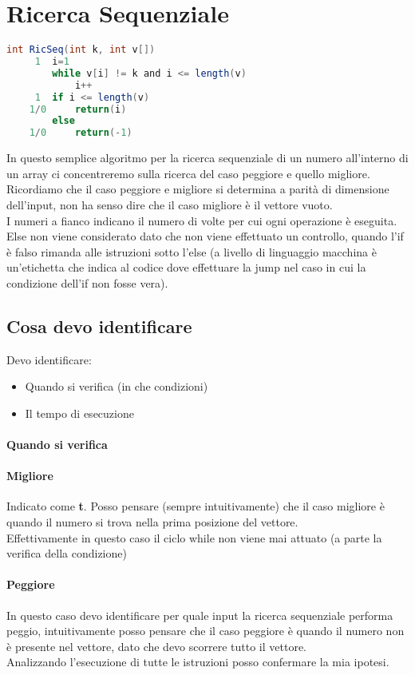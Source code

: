 \section{Ricerca Sequenziale}
\begin{lstlisting}[language=Java]
    int RicSeq(int k, int v[])
     1  i=1
        while v[i] != k and i <= length(v)
            i++
     1  if i <= length(v)
    1/0     return(i)
        else
    1/0     return(-1)
\end{lstlisting}
In questo semplice algoritmo per la ricerca sequenziale di un numero all'interno
di un array ci concentreremo sulla ricerca del caso peggiore e quello migliore.\\
Ricordiamo che il caso peggiore e migliore si determina a parità di dimensione dell'input,
non ha senso dire che il caso migliore è il vettore vuoto.\\
I numeri a fianco indicano il numero di volte per cui ogni operazione è eseguita.
Else non viene considerato dato che non viene effettuato un controllo, quando l'if è falso rimanda
alle istruzioni sotto l'else (a livello di linguaggio macchina è un'etichetta che indica al codice
dove effettuare la jump nel caso in cui la condizione dell'if non fosse vera).
\subsection{Cosa devo identificare}
Devo identificare:
\begin{itemize}
    \item Quando si verifica (in che condizioni)
    \item Il tempo di esecuzione
\end{itemize}
\paragraph*{Quando si verifica}
\paragraph*{Migliore} Indicato come \textbf{t}. Posso pensare (sempre intuitivamente) che il caso migliore è quando il numero
si trova nella prima posizione del vettore.\\
Effettivamente in questo caso il ciclo while non viene mai attuato (a parte la verifica della condizione)
\paragraph*{Peggiore} In questo caso devo identificare per quale input la ricerca sequenziale
performa peggio, intuitivamente posso pensare che il caso peggiore è quando il numero non è presente
nel vettore, dato che devo scorrere tutto il vettore.\\
Analizzando l'esecuzione di tutte le istruzioni posso confermare la mia ipotesi.\\
